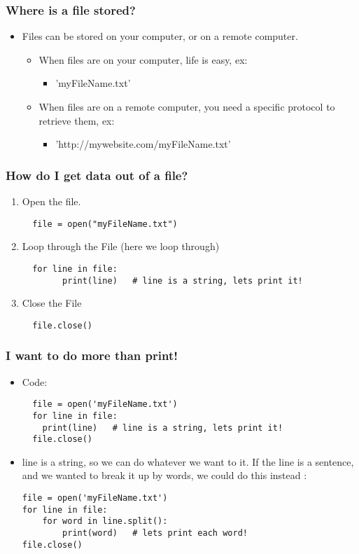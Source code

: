 \documentclass{beamer}
\begin{document}
\begin{frame}[fragile]
\frametitle{Where is a file stored?}
\begin{itemize}
\item Files can be stored on your computer, or on a remote computer.
\begin{itemize}
\item When files are on your computer, life is easy, ex:
\begin{itemize}
\item  'myFileName.txt'
\end{itemize}
\item When files are on a remote computer, you need a specific protocol to retrieve them, ex:
\begin{itemize}
\item 'http://mywebsite.com/myFileName.txt'
\end{itemize}
\end{itemize} 
\end{itemize}
\end{frame}

\begin{frame}[fragile]
\frametitle{How do I get data out of a file?}
\begin{enumerate}
\item Open the file.
  \begin{lstlisting}
  file = open("myFileName.txt")
  \end{lstlisting}
\item Loop through the File (here we loop through)
  \begin{lstlisting}
  for line in file:
        print(line)   # line is a string, lets print it!
  \end{lstlisting}
\item Close the File
  \begin{lstlisting}
  file.close()
  \end{lstlisting}
\end{enumerate}
\end{frame}

\begin{frame}[fragile]
\frametitle{I want to do more than print!}
\begin{itemize}
\item Code:
  \begin{lstlisting}
  file = open('myFileName.txt')
  for line in file:
    print(line)   # line is a string, lets print it!
  file.close()  
  \end{lstlisting}
\item line is a string, so we can do whatever we want to it.  If the line is a sentence, and we wanted to break it up by words, we could do this instead :
  \begin{lstlisting}
file = open('myFileName.txt')
for line in file:
    for word in line.split():
        print(word)   # lets print each word!
file.close()
  \end{lstlisting}
\end{itemize}
\end{frame}
\end{document}
